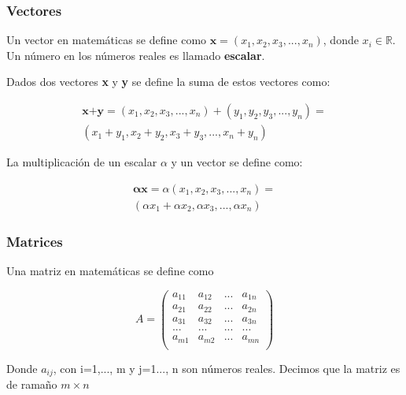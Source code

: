 \documentclass{beamer}
\begin{document}
\begin{frame}
\frametitle{Vectores}

Un vector en matemáticas se define como $\textbf{x} = ( x_1, x_2, x_3, ..., x_n )$, 
donde $x_i \in  \mathbb{R} $. Un número en los números reales es llamado \textbf{escalar}.

\hfill

Dados dos vectores \textbf{x} y \textbf{y} se define la suma de estos vectores como:

\[
\begin{matrix}
\textbf{x+y} = ( x_1, x_2, x_3, ..., x_n ) + ( y_1, y_2, y_3, ..., y_n ) = \\
( x_1+y_1, x_2+y_2, x_3+y_3, ..., x_n+y_n )
\end{matrix}
\]

La multiplicación de un escalar $\alpha$ y un vector se define como:

\[
\begin{matrix}
\mathbf{\alpha x} = \alpha ( x_1, x_2, x_3, ..., x_n ) = \\
( \alpha x_1+ \alpha x_2, \alpha x_3, ..., \alpha x_n )
\end{matrix}
\]

\end{frame}

\begin{frame}
\frametitle{Matrices}

Una matriz en matemáticas se define como

\[
A = \begin{pmatrix}
a_{11} & a_{12}  & ...  & a_{1n} \\
a_{21} & a_{22}  & ...  & a_{2n} \\
a_{31} & a_{32}  & ...  & a_{3n} \\
... & ... & ... & ... \\
a_{m1} & a_{m2}  & ...  & a_{mn}  \\
\end{pmatrix}
\]

Donde $a_{ij}$, con i=1,..., m y j=1..., n son números reales. Decimos que la matriz es de 
ramaño $m \times n$


\end{frame}
\end{document}
